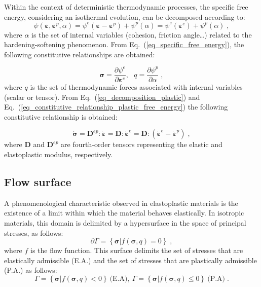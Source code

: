\documentclass[Journal,letterpaper]{ascelike-new}
\newcommand{\Dsdee}{\boldsymbol{D}}
\newcommand{\Dsdep}{\boldsymbol{D}^{ep}}
\newcommand{\dstraine}{\boldsymbol{\dot{\varepsilon}}^{e}}
\newcommand{\dstrainp}{\boldsymbol{\dot{\varepsilon}}^{p}}
\newcommand{\straine}{\boldsymbol{\varepsilon}^{e}}
\newcommand{\strainp}{\boldsymbol{\varepsilon}^{p}}
\newcommand{\dstrain}{\boldsymbol{\dot{\varepsilon}}}
\newcommand{\dstress}{\boldsymbol{\dot{\sigma}}}
\newcommand{\strain}{\boldsymbol{\varepsilon}}
\newcommand{\stress}{\boldsymbol{\sigma}}
\begin{document}
Within the context of deterministic thermodynamic processes, the specific free energy, considering an isothermal evolution, can be decomposed according to:
\begin{equation} \label{eq_specific_free_energy}
    \psi(\strain,\strainp,\alpha) = \psi^e(\strain-\strainp)+\psi^p(\alpha) = \psi^e(\strain^e)+\psi^p(\alpha)\;,
\end{equation}
where $\alpha$ is the set of internal variables (cohesion, friction angle…) related to the hardening-softening phenomenon. From Eq.~(\ref{eq_specific_free_energy}), the following constitutive relationships are obtained:

\begin{equation} \label{eq_constitutive_relationship_plastic_free_energy}
    \stress = \dfrac{\partial \psi^e}{\partial \straine}, ~~~ q = \dfrac{\partial \psi^p}{\partial \alpha}\;,
\end{equation}
where $q$ is the set of thermodynamic forces associated with internal variables (scalar or tensor). From Eq.~(\ref{eq_decomposition_plastic}) and Eq.~(\ref{eq_constitutive_relationship_plastic_free_energy}) the following constitutive relationship is obtained:

\begin{equation} \label{eq_constitutive_relationship_plastic}
    \dstress = \Dsdep : \dstrain = \Dsdee : \dstraine = \Dsdee : (\dstraine - \dstrainp)\;,
\end{equation}
where $\Dsdee$  and $\Dsdep$ are fourth-order tensors representing the elastic and elastoplastic modulus, respectively.

\subsection{Flow surface}

A phenomenological characteristic observed in elastoplastic
materials is the existence of a limit within which the material behaves elastically. In isotropic materials, this domain is delimited by a hypersurface in the space of principal stresses, as follows:
\begin{equation} \label{eq_hypersurface}
    \partial \Gamma = \left\{ \stress | f(\stress,q) = 0 \right\}\;,
\end{equation}
where $f$ is the flow function. This surface delimits the set of stresses that are elastically admissible (E.A.) and the set of stresses that are plastically admissible (P.A.) as follows:
\begin{equation} \label{eq_PA_domain}
    \Gamma = \left\{ \stress | f(\stress,q) < 0 \right\}~\text{(E.A)}, ~ \Gamma = \left\{ \stress | f(\stress,q) \leq 0 \right\}~\text{(P.A)}\;.
\end{equation}
\end{document}
